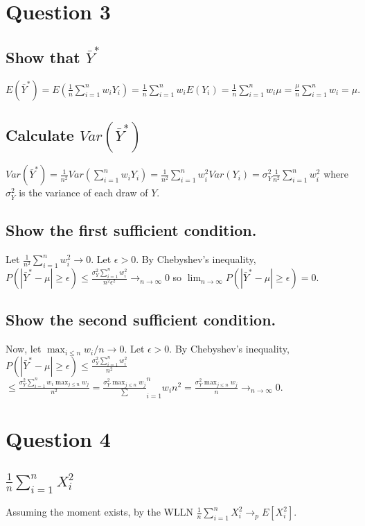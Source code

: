 \documentclass[11pt]{article} %
\begin{document}
\section{Question 3}
\subsection{Show that $\bar{Y}^{*}$}
$E(\bar{Y}^{*}) = E(\frac{1}{n}\sum_{i=1}^nw_iY_i) = \frac{1}{n}\sum_{i=1}^nw_iE(Y_i) =  \frac{1}{n}\sum_{i=1}^nw_i\mu =  \frac{\mu}{n}\sum_{i=1}^nw_i = \mu.$
\subsection{Calculate $Var(\bar{Y}^{*})$} %
$Var(\bar{Y}^{*}) =\frac{1}{n^2}Var(\sum_{i=1}^nw_iY_i)= \frac{1}{n^2}\sum_{i=1}^nw_i^2Var(Y_i) = \sigma_Y^2\frac{1}{n^2}\sum_{i=1}^nw_i^2$ where $\sigma_Y^2$ is the variance of each draw of $Y$.%
\subsection{Show the first sufficient condition.}
Let $\frac{1}{n^2}\sum_{i=1}^n w_i^2 \rightarrow 0.$ Let $\epsilon>0$. By Chebyshev's inequality, $P(|\bar{Y}^{*}-\mu|\geq \epsilon) \leq \frac{\sigma_Y^2\sum_{i=1}^nw_i^2}{n^2\epsilon^2} \rightarrow_{n\rightarrow \infty}0 $ so $\lim_{n\rightarrow \infty} P(|\bar{Y}^{*}-\mu|\geq \epsilon) = 0.$

\subsection{Show the second sufficient condition.}
Now, let $\max_{i\leq n}w_i/n \rightarrow 0$. Let $\epsilon>0$. By Chebyshev's inequality, $P(|\bar{Y}^{*}-\mu|\geq \epsilon) \leq \frac{\sigma_Y^2\sum_{i=1}^nw_i^2}{n^2} $\\$\leq \frac{\sigma_Y^2\sum_{i=1}^nw_i \max_{j\leq n}w_j}{n^2} = \frac{\sigma_Y^2\max_{j\leq n}w_j}\sum_{i=1}^nw_i {n^2} =  \frac{\sigma_Y^2\max_{j\leq n}w_j}{n} \rightarrow_{n\rightarrow \infty} 0. $

\section{Question 4}
\subsection{$\frac{1}{n}\sum_{i=1}^n X_i^2$}
Assuming the moment exists, by the WLLN $\frac{1}{n}\sum_{i=1}^n X_i^2 \rightarrow_p E[X_i^2]$.
\end{document}
